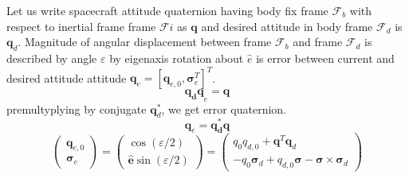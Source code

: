 Let us write spacecraft attitude quaternion having body fix frame $\displaystyle \mathcal{F}_{b}$ with respect to inertial frame frame $\displaystyle \mathcal{F} i$ as $\displaystyle \mathbf{q}$ and desired attitude in body frame $\displaystyle \mathcal{F}_{d}$ is $\displaystyle \mathbf{q}_{d}$. Magnitude of angular displacement between frame $\displaystyle \mathcal{F}_{b}$ and frame $\displaystyle \mathcal{F}_{d}$ is described by angle $\displaystyle \varepsilon $ by eigenaxis rotation about $\displaystyle \hat{e}$ is error between current and desired attitude attitude $\displaystyle \mathbf{q}_{e} =\left[\mathbf{q}_{e,0} ,\mathbf{\sigma }^{T}_{e}\right]^{T}$.
\begin{equation*}
\mathbf{q_{d} q}_{e} =\mathbf{q}
\end{equation*}
premultyplying by conjugate $\displaystyle \mathbf{q}^{*}_{d}$, we get error quaternion.
\begin{equation*}
\mathbf{q}_{e} =\mathbf{q^{*}_{d} q}
\end{equation*}
\begin{equation}
\begin{pmatrix}
\mathbf{q}_{e,0}\\
\mathbf{\sigma }_{e}
\end{pmatrix} =\begin{pmatrix}
\cos( \varepsilon /2) \ \\
\mathbf{\hat{e}}\sin( \varepsilon /2)
\end{pmatrix} =\begin{pmatrix}
q_{0} q_{d,0} +\mathbf{q}^{T}\mathbf{q}_{d}\\
-q_{0}\mathbf{\sigma }_{d} +q_{d,0}\mathbf{\sigma } -\mathbf{\sigma } \times \mathbf{\sigma }_{d}
\end{pmatrix}
\end{equation}
